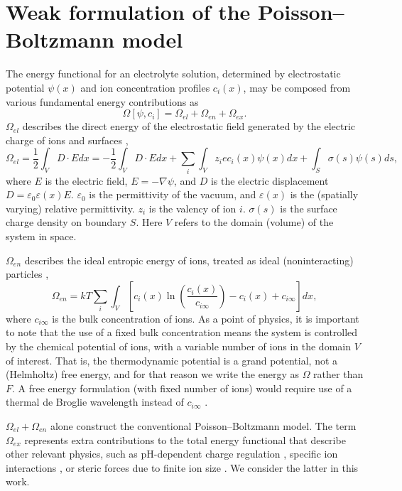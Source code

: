 \section{Weak formulation of the Poisson--Boltzmann model}

The energy functional for an electrolyte solution, determined by
electrostatic potential $\psi(x)$ and ion concentration profiles
$c_i(x)$, may be composed from various fundamental energy
contributions as
\begin{equation}
    \Omega[\psi, c_i] = \Omega_{el} + \Omega_{en} +  \Omega_{ex}.
\end{equation}
$\Omega_{el}$ describes the direct energy of the electrostatic field generated by the electric charge of ions and surfaces \citep{Jackson_Classical_Electrodynamics},
\begin{equation}
  \Omega_{el}  =\frac{1}{2} \int_{V}D \cdot E dx
  = -\frac{1}{2} \int_{V}D \cdot E dx + \sum_i \int_V z_i e c_i(x) \psi(x) dx
  + \int_{S} \sigma(s) \psi(s) ds,
\end{equation}
where $E$ is the electric field, $E=-\nabla\psi$, and $D$ is the
electric displacement $D=\varepsilon_0
\varepsilon(x)E$. $\varepsilon_0$ is the permittivity of the vacuum,
and $\varepsilon(x)$ is the (spatially varying) relative
permittivity. $z_i$ is the valency of ion $i$.  $\sigma(s)$ is the
surface charge density on boundary $S$. Here $V$ refers to the domain
(volume) of the system in space.

$\Omega_{en}$ describes the ideal entropic energy of ions, treated as ideal (noninteracting) particles \citep{GrayStiles2018,DagmawiParsons2024},
\begin{equation}
    \Omega_{en} = kT \sum_{i} \int_{V} \left[ c_i(x) \ln \left(\frac{c_i(x)}{c_{i\infty}} \right) - c_{i}(x) + c_{i\infty} \right] dx,
\end{equation}
where $c_{i\infty}$ is the bulk concentration of ions. As a point of
physics, it is important to note that the use of a fixed bulk
concentration means the system is controlled by the chemical potential
of ions, with a variable number of ions in the domain $V$ of interest.
That is, the thermodynamic potential is a grand potential, not a
(Helmholtz) free energy, and for that reason we write the energy as $\Omega$ rather
than $F$. A free energy formulation (with fixed number of ions) would
require use of a thermal de Broglie wavelength instead of
$c_{i\infty}$ \citep{GrayStiles2018}.


$\Omega_{el} + \Omega_{en}$ alone construct the conventional
Poisson--Boltzmann model. The term $\Omega_{ex}$ represents extra
contributions to the total energy functional that describe other
relevant physics, such as pH-dependent charge regulation
\citep{ParsonsSalis2019}, specific ion interactions
\citep{ParsonsCarucciSalis2022}, or steric forces due to finite ion
size \citep{LopezGarciaHornoGrosse2018}. We consider the latter in this
work.

